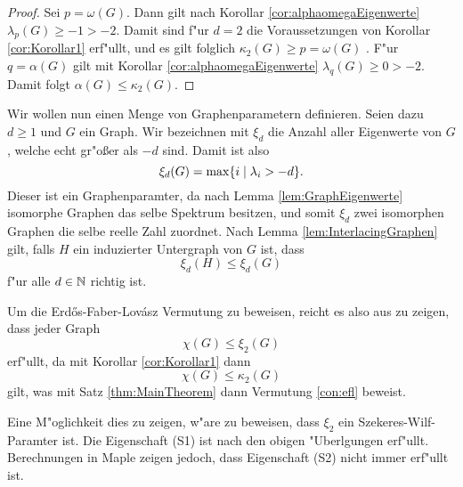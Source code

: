 \begin{proof}
  Sei $p = \omega(G)$. Dann gilt nach Korollar \ref{cor:alphaomegaEigenwerte} $\lambda_{p}\left( G \right)\geq -1 > -2$. Damit sind f"ur $d=2$ die Voraussetzungen von Korollar \ref{cor:Korollar1} erf"ullt, und es gilt folglich $\kappa_{2}\left( G \right)\geq p = \omega\left( G \right)$ .
  F"ur $q=\alpha\left( G \right)$ gilt mit Korollar \ref{cor:alphaomegaEigenwerte} $\lambda_{q}\left( G \right)\geq 0 > -2$. Damit folgt $\alpha\left( G \right) \leq \kappa_{2}\left( G \right)$.
\end{proof}

Wir wollen nun einen Menge von Graphenparametern definieren. Seien dazu $d\geq 1$ und $G$ ein Graph. Wir bezeichnen mit $\xi_{d}$ die Anzahl aller Eigenwerte von $G$, welche echt gr"o{\ss}er als $-d$ sind. Damit ist also 
$$\xi_{d}(G) = \max \{i \;|\; \lambda_i > -d \}.$$
Dieser ist ein Graphenparamter, da nach Lemma \ref{lem:GraphEigenwerte} isomorphe Graphen das selbe Spektrum besitzen, und somit $\xi_d $ zwei isomorphen Graphen die selbe reelle Zahl zuordnet. 
Nach Lemma \ref{lem:InterlacingGraphen} gilt, falls $H$ ein induzierter Untergraph von $G$ ist, dass $$\xi_d(H) \leq \xi_{d}(G)$$ f"ur alle $d\in {\mathbb{N}}$ richtig ist. 

Um die Erd\H{o}s-Faber-Lov\'asz Vermutung zu beweisen, reicht es also aus zu zeigen, dass jeder Graph $$\chi(G) \leq \xi_{2}(G)$$ erf"ullt, da mit Korollar \ref{cor:Korollar1} dann $$\chi(G) \leq \kappa_{2}(G)$$ gilt, was mit Satz \ref{thm:MainTheorem} dann Vermutung \ref{con:efl} beweist.

Eine M"oglichkeit dies zu zeigen, w"are zu beweisen, dass $\xi_2$ ein Szekeres-Wilf-Paramter ist. Die Eigenschaft (S1) ist nach den obigen "Uberlgungen erf"ullt. Berechnungen in Maple zeigen jedoch, dass Eigenschaft (S2) nicht immer erf"ullt ist. 

